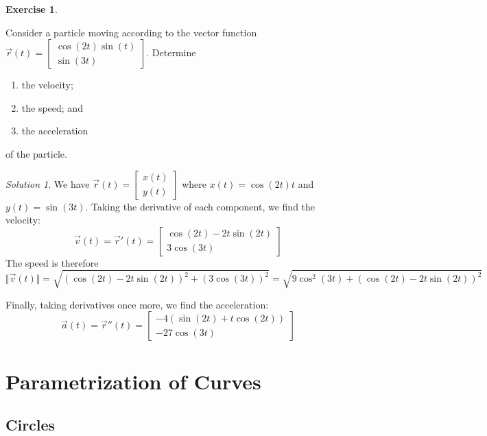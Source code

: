 \documentclass[
]{book}
\providecommand{\tightlist}{%
  \setlength{\itemsep}{0pt}\setlength{\parskip}{0pt}}
\theoremstyle{definition}
\theoremstyle{definition}
\theoremstyle{definition}
\newtheorem{exercise}{Exercise}[chapter]
\theoremstyle{definition}
\theoremstyle{remark}
\newtheorem*{solution}{Solution}
\begin{document}
\begin{exercise}
\protect\hypertarget{exr:unlabeled-div-32}{}\label{exr:unlabeled-div-32}

Consider a particle moving according to the vector function \(\vec{r}(t)=\begin{bmatrix}\cos(2t)\sin(t)\\ \sin(3t)\end{bmatrix}\). Determine

\begin{enumerate}
\def\labelenumi{\alph{enumi}.}
\tightlist
\item
  the velocity;
\item
  the speed; and
\item
  the acceleration
\end{enumerate}

of the particle.

\end{exercise}

\begin{solution}

We have \(\vec{r}(t)=\begin{bmatrix}x(t)\\y(t)\end{bmatrix}\) where \(x(t)=\cos(2t)t\) and \(y(t)=\sin(3t)\). Taking the derivative of each component, we find the velocity: \[\vec{v}(t)=\vec{r}'(t)=\begin{bmatrix}\cos(2t)-2t\sin(2t)\\ 3\cos(3t) \end{bmatrix}\] The speed is therefore \[\Vert\vec{v}(t)\Vert= \sqrt{(\cos(2t)-2t\sin(2t))^2+(3\cos(3t))^2} = \sqrt{9 \cos^2(3 t) + (\cos(2 t) - 2 t \sin(2 t))^2}\]

Finally, taking derivatives once more, we find the acceleration: \[\vec{a}(t)=\vec{r}''(t)=\begin{bmatrix}-4 (\sin(2 t) + t \cos(2 t)) \\ -27\cos(3t)\end{bmatrix}\]

\end{solution}

\hypertarget{parametrization-of-curves}{%
\section{Parametrization of Curves}\label{parametrization-of-curves}}

\hypertarget{circles}{%
\subsection{Circles}\label{circles}}
\end{document}
